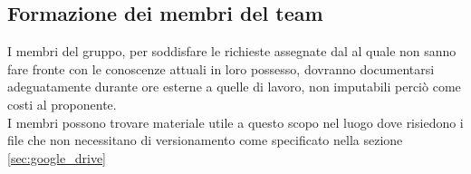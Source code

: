 	\subsection{Formazione dei membri del team}
	I membri del gruppo, per soddisfare le richieste assegnate dal \roleProjectManager{} al quale non sanno fare fronte con le conoscenze attuali in loro possesso, dovranno documentarsi adeguatamente durante ore esterne a quelle di lavoro, non imputabili perciò come costi al proponente\gloss{}.\\
	I membri possono trovare materiale utile a questo scopo nel luogo dove risiedono i file che non necessitano di versionamento come specificato nella sezione \ref{sec:google_drive}